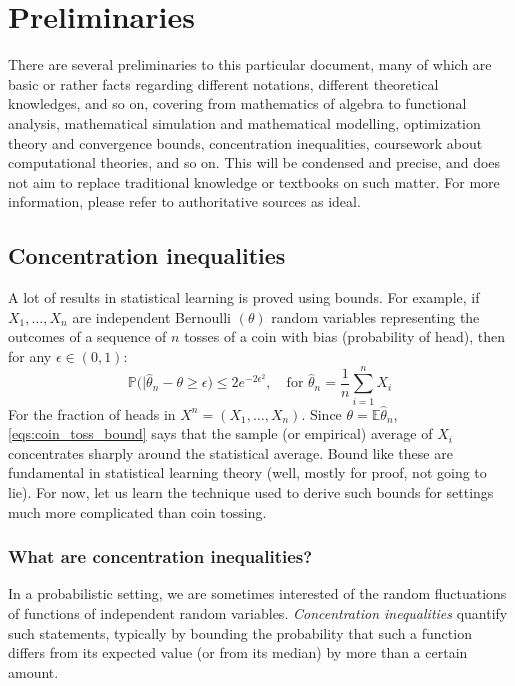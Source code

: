 \chapter{Preliminaries}

There are several preliminaries to this particular document, many of which are basic or rather facts regarding different notations, different theoretical knowledges, and so on, covering from mathematics of algebra to functional analysis, mathematical simulation and mathematical modelling, optimization theory and convergence bounds, concentration inequalities, coursework about computational theories, and so on. This will be condensed and precise, and does not aim to replace traditional knowledge or textbooks on such matter. For more information, please refer to authoritative sources as ideal. 
\section{Concentration inequalities}
A lot of results in statistical learning is proved using bounds. For example, if $X_{1},\dots,X_n$ are independent Bernoulli $(\theta)$ random variables representing the outcomes of a sequence of $n$ tosses of a coin with bias (probability of head), then for any $\epsilon \in (0,1)$: 
\begin{equation}\label{eqs:coin_toss_bound}
    \mathbb{P} \Big(\lvert \hat{\theta}_{n} - \theta \geq \epsilon\Big) \leq 2e^{-2\epsilon^{2}}, \quad \text{for } \hat{\theta}_{n} = \frac{1}{n} \sum^{n}_{i=1} X_i
\end{equation}
For the fraction of heads in $X^n=(X_1,\dots,X_n)$. Since $\theta = \mathbb{E}\hat{\theta}_{n}$, \ref{eqs:coin_toss_bound} says that the sample (or empirical) average of $X_{i}$ concentrates sharply around the statistical average. Bound like these are fundamental in statistical learning theory (well, mostly for proof, not going to lie). For now, let us learn the technique used to derive such bounds for settings much more complicated than coin tossing. 

\subsection{What are concentration inequalities?}

In a probabilistic setting, we are sometimes interested of the random fluctuations of functions of independent random variables. \textit{Concentration inequalities} quantify such statements, typically by bounding the probability that such a function differs from its expected value (or from its median) by more than a certain amount. 

